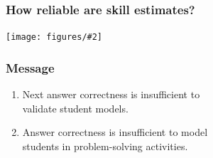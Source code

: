 \documentclass[bigger]{beamer}
\newcommand{\img}[2]{
  \begin{center}
    \texttt{[image: figures/\#2]}
  \end{center}
}
\begin{document}
\begin{frame}
  \frametitle{How reliable are skill estimates?}
  \bigskip
  \img{0.9}{reliability-skills}
\end{frame}


\begin{frame}
\frametitle{Message}
\begin{enumerate}
\item Next answer correctness is insufficient to\\validate student models.
\bigskip
\item Answer correctness is insufficient to model\\students in problem-solving activities.
\end{enumerate}
\end{frame}
\end{document}
